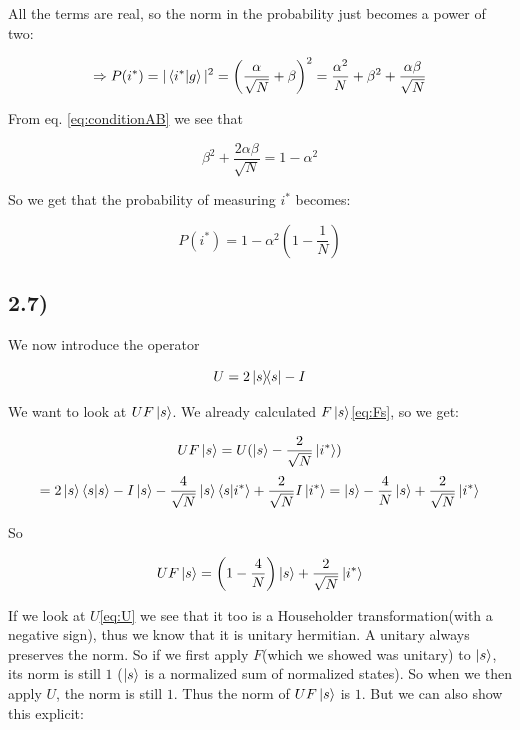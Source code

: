 \documentclass[a4paper,norsk, 10pt]{article}
\begin{document}
All the terms are real, so the norm in the probability just becomes a power of two:

\begin{equation}
\Rightarrow P(i^*) = |\braket{i^*}{g}|^2 = \left(\frac{\alpha}{\sqrt{N}} + \beta\right)^2 = \frac{\alpha^2}{N} + \beta^2 + \frac{\alpha\beta}{\sqrt{N}}
\end{equation}

From eq. \eqref{eq:conditionAB} we see that

\begin{equation}
\beta^2 + \frac{2\alpha \beta}{\sqrt{N}}  = 1 - \alpha^2
\end{equation}

So we get that the probability of measuring $i^*$ becomes:

\begin{equation}
P(i^*) = 1 - \alpha^2\left(1 - \frac{1}{N}\right)
\end{equation}\label{eq:prob}

\subsection{2.7)}

We now introduce the operator

\begin{equation}
U = 2\ketbra{s}{s} - I
\end{equation}\label{eq:U}

We want to look at $UF\ket{s}$. We already calculated $F\ket{s}$\eqref{eq:Fs}, so we get: 

\begin{equation}
UF\ket{s} = U(\ket{s} - \frac{2}{\sqrt{N}}\ket{i^*})
\end{equation}
\begin{equation}
= 2\ket{s}\braket{s}{s} - I\ket{s} - \frac{4}{\sqrt{N}}\ket{s}\braket{s}{i^*} + \frac{2}{\sqrt{N}}I\ket{i^*} = \ket{s} - \frac{4}{N}\ket{s} + \frac{2}{\sqrt{N}}\ket{i^*} 
\end{equation}

So

\begin{equation}
UF\ket{s} =  \left(1 - \frac{4}{N}\right)\ket{s} + \frac{2}{\sqrt{N}}\ket{i^*} 
\end{equation}\label{eq:UFs}


If we look at $U$\eqref{eq:U} we see that it too is a Householder transformation(with a negative sign), thus we know that it is unitary hermitian. A unitary always preserves the norm. So if we first apply $F$(which we showed was unitary) to $\ket{s}$, its norm is still $1$ ($\ket{s}$ is a normalized sum of normalized states). So when we then apply $U$, the norm is still $1$. Thus the norm of $UF\ket{s}$ is $1$. But we can also show this explicit:
\end{document}
